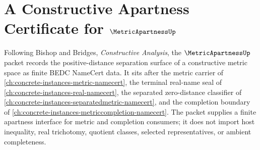 \chapter{A Constructive Apartness Certificate for $\MetricApartnessUp$}
\label{ch:concrete-instances-metric-apartness-namecert}

Following Bishop and Bridges, \emph{Constructive Analysis}, the $\MetricApartnessUp$ packet records the positive-distance separation surface of a constructive metric space as finite BEDC NameCert data. It sits after the metric carrier of \autoref{ch:concrete-instances-metric-namecert}, the terminal real-name seal of \autoref{ch:concrete-instances-real-namecert}, the separated zero-distance classifier of \autoref{ch:concrete-instances-separatedmetric-namecert}, and the completion boundary of \autoref{ch:concrete-instances-metriccompletion-namecert}. The packet supplies a finite apartness interface for metric and completion consumers; it does not import host inequality, real trichotomy, quotient classes, selected representatives, or ambient completeness.

